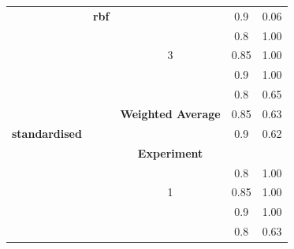 \documentclass{mpaper}
\begin{document}
\begin{table}[]
\begin{tabular}{|l|c|ccc|}
                                            & \textbf{rbf}    & \multicolumn{1}{c|}{}                          & \multicolumn{1}{c|}{0.9}                & 0.06               \\ \cline{3-5} 
                                            &                 & \multicolumn{1}{c|}{}                          & \multicolumn{1}{c|}{0.8}                & 1.00               \\
                                            &                 & \multicolumn{1}{c|}{3}                         & \multicolumn{1}{c|}{0.85}               & 1.00               \\
                                            &                 & \multicolumn{1}{c|}{}                          & \multicolumn{1}{c|}{0.9}                & 1.00               \\ \cline{3-5} 
                                            &                 & \multicolumn{1}{l|}{}                          & \multicolumn{1}{c|}{0.8}                & 0.65               \\
                                            &                 & \multicolumn{1}{c|}{\textbf{Weighted Average}} & \multicolumn{1}{c|}{0.85}               & 0.63               \\
\multicolumn{1}{|c|}{\textbf{standardised}} &                 & \multicolumn{1}{l|}{}                          & \multicolumn{1}{c|}{0.9}                & 0.62               \\ \cline{3-5}
                                            &                 & \multicolumn{1}{c|}{\textbf{Experiment}}       & \multicolumn{1}{c|}{}                   & \textbf{}          \\ \cline{3-5} 
                                            &                 & \multicolumn{1}{c|}{}                          & \multicolumn{1}{c|}{0.8}                & 1.00               \\
                                            &                 & \multicolumn{1}{c|}{1}                         & \multicolumn{1}{c|}{0.85}               & 1.00               \\
                                            &                 & \multicolumn{1}{c|}{}                          & \multicolumn{1}{c|}{0.9}                & 1.00               \\ \cline{3-5} 
                                            &                 & \multicolumn{1}{c|}{}                          & \multicolumn{1}{c|}{0.8}                & 0.63               \\

\end{tabular}
\end{table}
\end{document}
